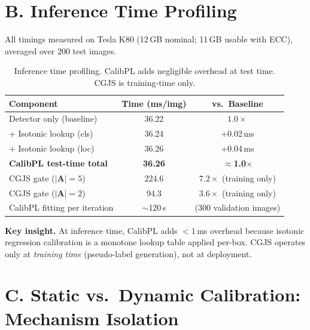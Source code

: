 \documentclass[10pt,twocolumn,letterpaper]{article}
\begin{document}
\section*{B. Inference Time Profiling}
\label{sec:timing}

All timings measured on Tesla K80 (12\,GB nominal; 11\,GB usable with ECC), averaged over 200 test images.

\begin{table}[h]
  \centering
  \caption{Inference time profiling. CalibPL adds negligible overhead at test
  time. CGJS is training-time only.}
  \begin{tabular}{lcc}
    \toprule
    Component & Time (ms/img) & vs.\ Baseline \\
    \midrule
    Detector only (baseline) & 36.22 & $1.0\times$ \\
    + Isotonic lookup (cls)  & 36.24 & +0.02\,ms \\
    + Isotonic lookup (loc)  & 36.26 & +0.04\,ms \\
    \textbf{CalibPL test-time total} & \textbf{36.26} & $\approx$\textbf{1.0$\times$} \\
    \midrule
    CGJS gate ($|\mathbf{A}|{=}5$) & 224.6 & $7.2\times$ (training only) \\
    CGJS gate ($|\mathbf{A}|{=}2$) & 94.3  & $3.6\times$ (training only) \\
    CalibPL fitting per iteration & $\sim$120\,s & (300 validation images) \\
    \bottomrule
  \end{tabular}
  \label{tab:timing}
\end{table}

\textbf{Key insight.} At inference time, CalibPL adds $<1$\,ms overhead because
isotonic regression calibration is a monotone lookup table applied per-box.
CGJS operates only at \emph{training time} (pseudo-label generation), not at
deployment.

\section*{C. Static vs.\ Dynamic Calibration: Mechanism Isolation}
\label{sec:static_vs_dynamic}
\end{document}
